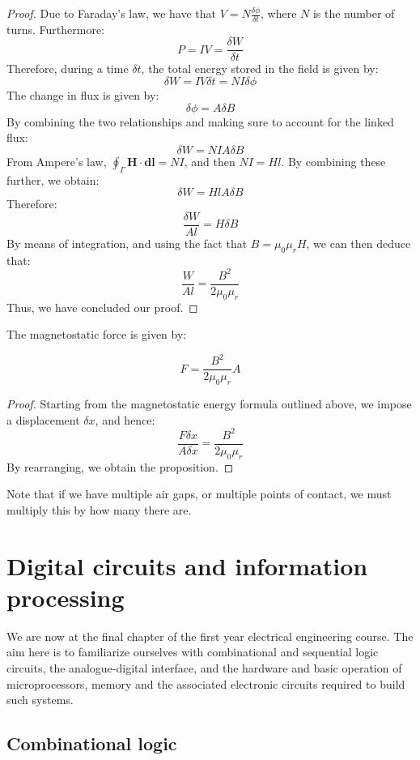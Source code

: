 \documentclass{article}
\begin{document}
\begin{proof}
    Due to Faraday's law, we have that $V = N\frac{\delta\phi}{\delta t}$, where $N$ is the number of turns. Furthermore:
    \[ P = IV = \frac{\delta W}{\delta t} \]
    Therefore, during a time $\delta t$, the total energy stored in the field is given by:
    \[ \delta W = IV\delta t = NI \delta\phi \]
    The change in flux is given by:
    \[ \delta\phi = A\delta B \]
    By combining the two relationships and making sure to account for the linked flux:
    \[ \delta W = NIA\delta B \]
    From Ampere's law, $\oint_\Gamma \mathbf{H} \cdot \mathbf{dl} = NI$, and then $NI = Hl$. By combining these further, we obtain:
    \[ \delta W = HlA\delta B \]
    Therefore:
    \[ \frac{\delta W}{Al} = H\delta B \]
    By means of integration, and using the fact that $B = \mu_0\mu_rH$, we can then deduce that:
    \[ \frac{W}{Al} = \frac{B^2}{2\mu_0\mu_r} \]
    Thus, we have concluded our proof.
\end{proof}

\begin{proposition}
    The magnetostatic force is given by:
    
    \[ F = \frac{B^2}{2\mu_0\mu_r}A \]
\end{proposition}

\begin{proof}
    Starting from the magnetostatic energy formula outlined above, we impose a displacement $\delta x$, and hence:
    \[ \frac{F \delta x}{A \delta x} = \frac{B^2}{2\mu_0\mu_r} \]
    By rearranging, we obtain the proposition.
\end{proof}

Note that if we have multiple air gaps, or multiple points of contact, we must multiply this by how many there are.

\newpage

\section{Digital circuits and information processing}

We are now at the final chapter of the first year electrical engineering course. The aim here is to familiarize ourselves with combinational and sequential logic circuits, the analogue-digital interface, and the hardware and basic operation of microprocessors, memory and the associated electronic circuits required to build such systems.

\subsection{Combinational logic}
\end{document}

